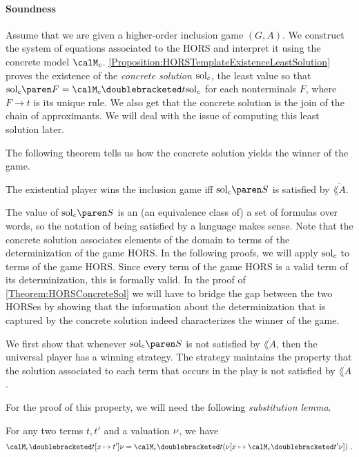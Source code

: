 \documentclass[../../diss.tex]{subfiles}
\begin{document}
\paragraph{Soundness}

Assume that we are given a higher-order inclusion game $(G,A)$.
We construct the system of equations associated to the HORS and interpret it using the concrete model $\modelc$.
\cref{Proposition:HORSTemplateExistenceLeastSolution} proves the existence of the \emph{concrete solution} $\solc$, the least value so that $\solc{F} = \semc{t}{\solc}$ for each nonterminals $F$, where $F \to t$ is its unique rule.
We also get that the concrete solution is the join of the chain of approximants.
We will deal with the issue of computing this least solution later.

The following theorem tells us how the concrete solution yields the winner of the game.

\begin{theorem}%
\label{Theorem:HORSConcreteSol}%
    The existential player wins the inclusion game iff $\solc{S}$ is satisfied by $\overline{\lang{A}}$.
\end{theorem}

The value of $\solc{S}$ is an (an equivalence class of) a set of formulas over words, so the notation of being satisfied by a language makes sense.
Note that the concrete solution associates elements of the domain to terms of the determinization of the game HORS.\@
In the following proofs, we will apply $\solc$ to terms of the game HORS.\@
Since every term of the game HORS is a valid term of its determinization, this is formally valid.
In the proof of \cref{Theorem:HORSConcreteSol} we will have to bridge the gap between the two HORSes by showing that the information about the determinization that is captured by the concrete solution indeed characterizes the winner of the game.

We first show that whenever $\solc{S}$ is not satisfied by $\overline{\lang{A}}$, then the universal player has a winning strategy.
The strategy maintains the property that the solution associated to each term that occurs in the play is not satisfied by $\overline{\lang{A}}$.

For the proof of this property, we will need the following \emph{substitution lemma}.

\begin{lemma}%
\label{Lemma:HORSFPSemanticsSubstitution}%
    For any two terms $t, t'$ and a valuation $\nu$, we have
    \[
        \semc{t[x \mapsto t']}{\val}
        =
        \semc{t}{(\val[x \mapsto \semc{t'}{\val}])}
        \ .
    \]
\end{lemma}
\end{document}

